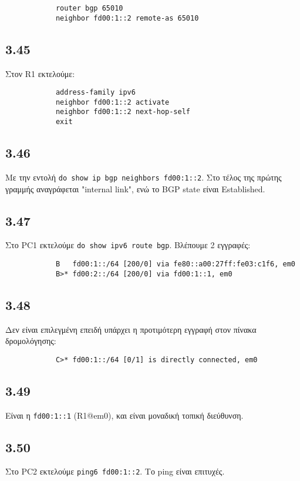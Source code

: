 \documentclass[a4paper, 12pt]{article}
\begin{document}
		\begin{verbatim}
			router bgp 65010
			neighbor fd00:1::2 remote-as 65010
		\end{verbatim}

	\subsection*{3.45}
		Στον R1 εκτελούμε:
		
		\begin{verbatim}
			address-family ipv6
			neighbor fd00:1::2 activate
			neighbor fd00:1::2 next-hop-self
			exit
		\end{verbatim}

	\subsection*{3.46}
		Με την εντολή \verb|do show ip bgp neighbors fd00:1::2|. Στο τέλος της πρώτης γραμμής αναγράφεται "internal link", ενώ το BGP state είναι Established.

	\subsection*{3.47}
		Στο PC1 εκτελούμε \verb|do show ipv6 route bgp|. Βλέπουμε 2 εγγραφές:
		
		\begin{verbatim}
			B   fd00:1::/64 [200/0] via fe80::a00:27ff:fe03:c1f6, em0
			B>* fd00:2::/64 [200/0] via fd00:1::1, em0
		\end{verbatim}
		
	\subsection*{3.48}
		Δεν είναι επιλεγμένη επειδή υπάρχει η προτιμότερη εγγραφή στον πίνακα δρομολόγησης:
		
		\begin{verbatim}
			C>* fd00:1::/64 [0/1] is directly connected, em0
		\end{verbatim}

	\subsection*{3.49}
		Είναι η \verb|fd00:1::1| (R1@em0), και είναι μοναδική τοπική διεύθυνση.

	\subsection*{3.50}
		Στο PC2 εκτελούμε \verb|ping6 fd00:1::2|. Το ping είναι επιτυχές.
\end{document}

